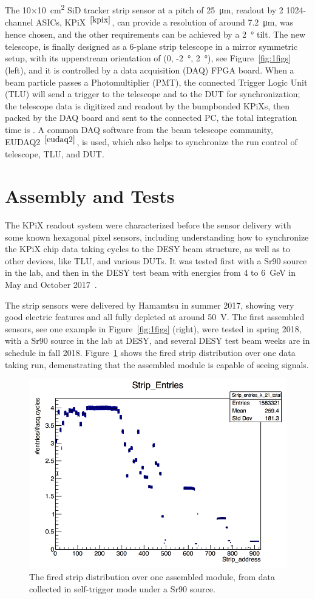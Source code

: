 The 10$\times$\SI{10}{\square\centi\metre} SiD tracker strip sensor at a pitch of \SI{25}{\micro\metre}, readout by 2 1024-channel ASICs, KPiX~$^{\cite{kpix}}$, can provide a resolution of around \SI{7.2}{\micro\metre},
was hence chosen, and the other requirements can be achieved by a \SI{2}{\degree} tilt.
The new telescope, \lycoris is finally designed as a 6-plane strip telescope in a mirror symmetric setup, with its upperstream orientation of (0, -\SI{2}{\degree}, \SI{2}{\degree}), see Figure~\ref{fig:1figs} (left), and it is controlled by a data acquisition (DAQ) FPGA board.
When a beam particle passes a Photomultiplier (PMT), the connected Trigger Logic Unit (TLU) will send a trigger to the telescope and to the DUT for synchronization;
the telescope data is digitized and readout by the bumpbonded KPiXs, then packed by the DAQ board and sent to the connected PC, the total integration time is .
A common DAQ software from the beam telescope community, EUDAQ2~$^{\cite{eudaq2}}$, is used, which also helps to synchronize the run control of telescope, TLU, and DUT.

\section*{Assembly and Tests}

The KPiX readout system were characterized before the sensor delivery with some known hexagonal pixel sensors,
including understanding how to synchronize the KPiX chip data taking cycles to the DESY beam structure, as well as to other devices, like TLU, and various DUTs.
It was tested first with a Sr90 source in the lab, and then in the DESY test beam with energies from 4 to \SI{6}{\GeV} in May and October 2017~\cite{lycoris1}.

The strip sensors were delivered by Hamamtsu in summer 2017, showing very good electric features and all fully depleted at around \SI{50}{\volt}.
The first assembled sensors, see one example in Figure~\ref{fig:1figs} (right), were tested in spring 2018, with a Sr90 source in the lab at DESY, and several DESY test beam weeks are in schedule in fall 2018.
Figure~\ref{fig:2figs} shows the fired strip distribution over one data taking run, demenstrating that the assembled module is capable of seeing signals.

\begin{figure}[!ht]%
\centering
\includegraphics[width=0.49\linewidth]{pics/S58_K2_2018_05_07_16_49_42_strip_entries.png}
\caption{The fired strip distribution over one assembled module, from data collected in self-trigger mode under a Sr90 source. }%
\label{fig:2figs}%
\end{figure}

